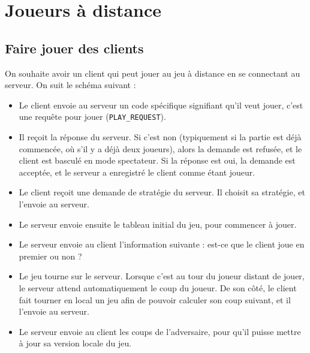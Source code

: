\documentclass[a4paper]{article}
\newcommand{\TODO}{\textcolor{red}{\textbf{TODO}}}
\begin{document}
\section{Joueurs à distance}

\subsection{Faire jouer des clients}

On souhaite avoir un client qui peut jouer au jeu à distance en se connectant au serveur. On suit le schéma suivant :

%
\begin{itemize}
	\setlength\itemsep{0.5em}
	\item Le client envoie au serveur un code spécifique signifiant qu'il veut jouer, c'est une requête pour jouer (\texttt{PLAY\_REQUEST}).
	\item Il reçoit la réponse du serveur. Si c'est non (typiquement si la partie est déjà commencée, où s'il y a déjà deux joueurs), alors la demande est refusée, et le client est basculé en mode spectateur. Si la réponse est oui, la demande est acceptée, et le serveur a enregistré le client comme étant joueur.
	\item Le client reçoit une demande de stratégie du serveur. Il choisit sa stratégie, et l'envoie au serveur.
	\item Le serveur envoie ensuite le tableau initial du jeu, pour commencer à jouer.
	\item Le serveur envoie au client l'information suivante : est-ce que le client joue en premier ou non ?
	\item Le jeu tourne sur le serveur. Lorsque c'est au tour du joueur distant 
	de jouer, le serveur attend automatiquement le coup du joueur. De son côté, 
	le client fait tourner en local un jeu afin de pouvoir calculer son coup 
	suivant, et il l'envoie au serveur.
	\item Le serveur envoie au client les coups de l'adversaire, pour qu'il puisse mettre à jour sa version locale du jeu.
\end{itemize}
%
\end{document}
